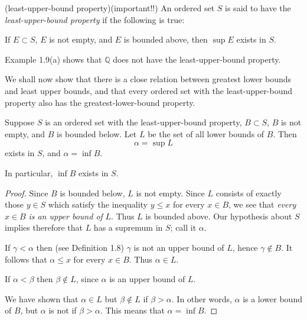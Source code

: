 \begin{Definition}(least-upper-bound property)(important!!)
An ordered set $S$ is said to have the \emph{least-upper-bound property}
if the following is true:

If $E \subset S$, $E$ is not empty, and $E$ is bounded above, then $\sup E$ exists in $S$.
\end{Definition}

Example 1.9(a) shows that $\mathbb{Q}$ does not have the least-upper-bound property.

We shall now show that there is a close relation between greatest lower
bounds and least upper bounds, and that every ordered set with the least-upper-bound property also has the greatest-lower-bound property.

\begin{thm}
Suppose $S$ is an ordered set with the least-upper-bound property,
$B \subset S$, $B$ is not empty, and $B$ is bounded below. Let $L$ be the set of all lower
bounds of $B$. Then
\begin{equation*}
    \alpha = \sup L
\end{equation*}
exists in $S$, and $\alpha = \inf B$.

In particular, $\inf B$ exists in $S$.
\end{thm}

\begin{proof}
Since $B$ is bounded below, $L$ is not empty. Since $L$ consists of
exactly those $y \in S$ which satisfy the inequality $y \leq x$ for every $x \in B$, we
see that \emph{every} $x \in B$ \emph{is an upper bound of} $L$. Thus $L$ is bounded above.
Our hypothesis about $S$ implies therefore that $L$ has a supremum in $S$;
call it $\alpha$.

If $\gamma <\alpha$ then (see Definition 1.8) $\gamma$ is not an upper bound of $L$,
hence $\gamma \not\in B$. It follows that $\alpha \leq x$ for every $x \in B$. Thus $\alpha \in L$.

If $\alpha < \beta$ then $\beta \not\in L$, since $\alpha$ is an upper bound of $L$.

We have shown that $\alpha \in L$ but $\beta \not\in  L$ if $\beta>\alpha$. In other words, $\alpha$
is a lower bound of $B$, but $\alpha$ is not if $\beta > \alpha$. This means that $\alpha = \inf B$.
\end{proof}


